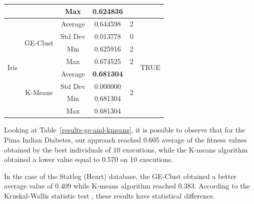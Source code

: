 \documentclass[conference]{IEEEtran}
\begin{document}
\begin{table}[]
\begin{tabular}{|c|c|c|c|c|c|}
			&                               & Max                            & 0.624836                    &                          &                       \\ \hline
			\multirow{8}{*}{Iris}                  & \multirow{4}{*}{GE-Clust}           & Average                        & 0.644598                   & 2                        & \multirow{8}{*}{TRUE} \\ \cline{3-5}
			&                               & Std Dev                        & 0.013778                   & 0                        &                       \\ \cline{3-5}
			&                               & Min                            & 0.625916                   & 2                        &                       \\ \cline{3-5}
			&                               & Max                            & 0.674525                   & 2                        &                       \\ \cline{2-5}
			& \multirow{4}{*}{K-Means}      & Average                        & \textbf{0.681304}                   & \multirow{4}{*}{ 2} &                       \\ \cline{3-4}
			&                               & Std Dev                        & 0.000000                   &                          &                       \\ \cline{3-4}
			&                               & Min                            & 0.681304                   &                          &                       \\ \cline{3-4}
			&                               & Max                            & 0.681304                   &                          &                       \\ \cline{3-4}							\hline
		\end{tabular}
	\end{table}
	
	
	
	Looking at Table~\ref{results-ge-and-kmeans}, it is possible to observe that for the Pima Indian Diabetes, our approach reached 0.605 average of the fitness values obtained by the best individuals of 10 executions, while the K-means algorithm obtained a lower value equal to 0.570 on 10 executions.
	
	
	In the case of the Statlog (Heart) database,  the GE-Clust obtained a better average value of 0.409 while K-means algorithm reached 0.383. According to the  Kruskal-Wallis statistic test \cite{mckight2010kruskal}, these results have statistical difference.
	
\end{document}
